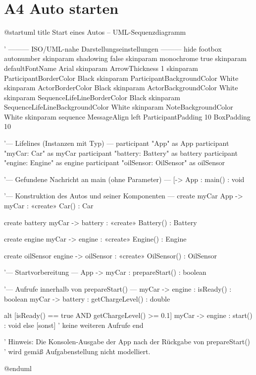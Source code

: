 \documentclass[12pt]{article}
\begin{document}
\section*{A4 Auto starten}
\renewcommand{\PlantUMLJobname}{swt-a4}
\begin{plantuml}
  
@startuml
title Start eines Autos – UML-Sequenzdiagramm

' ——— ISO/UML-nahe Darstellungseinstellungen ———
hide footbox
autonumber
skinparam shadowing false
skinparam monochrome true
skinparam defaultFontName Arial
skinparam ArrowThickness 1
skinparam ParticipantBorderColor Black
skinparam ParticipantBackgroundColor White
skinparam ActorBorderColor Black
skinparam ActorBackgroundColor White
skinparam SequenceLifeLineBorderColor Black
skinparam SequenceLifeLineBackgroundColor White
skinparam NoteBackgroundColor White
skinparam sequence {
  MessageAlign left
  ParticipantPadding 10
  BoxPadding 10
}

'— Lifelines (Instanzen mit Typ) —
participant "App" as App
participant "myCar: Car" as myCar
participant "battery: Battery" as battery
participant "engine: Engine" as engine
participant "oilSensor: OilSensor" as oilSensor

'— Gefundene Nachricht an main (ohne Parameter) —
[-> App : main() : void

'— Konstruktion des Autos und seiner Komponenten —
create myCar
App -> myCar : «create» Car() : Car

create battery
myCar -> battery : «create» Battery() : Battery

create engine
myCar -> engine : «create» Engine() : Engine

create oilSensor
engine -> oilSensor : «create» OilSensor() : OilSensor

'— Startvorbereitung —
App -> myCar : prepareStart() : boolean

'— Aufrufe innerhalb von prepareStart() —
myCar -> engine : isReady() : boolean
myCar -> battery : getChargeLevel() : double

alt [isReady() == true AND getChargeLevel() >= 0.1]
  myCar -> engine : start() : void
else [sonst]
  ' keine weiteren Aufrufe
end

' Hinweis: Die Konsolen-Ausgabe der App nach der Rückgabe von prepareStart()
' wird gemäß Aufgabenstellung nicht modelliert.

@enduml


\end{plantuml}
\end{document}
